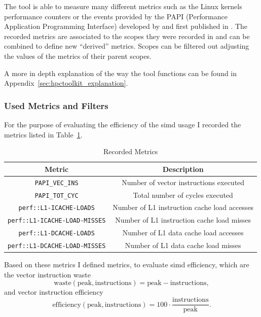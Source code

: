 \documentclass[a4paper, 11pt]{memoir}
\begin{document}
    The tool is able to measure many different metrics such as the Linux kernels performance counters or the events
    provided by the PAPI (Performance Application Programming Interface) developed by \citeauthor{papi} and first published
    in \cite{papi}. The recorded metrics are associated to the scopes they were recorded in and can be combined to define
    new \enquote{derived} metrics. Scopes can be filtered out adjusting the values of the metrics of their parent scopes.

    A more in depth explanation of the way the tool functions can be found in Appendix~\ref{sec:hpctoolkit_explanation}.

    \subsubsection{Used Metrics and Filters}
    For the purpose of evaluating the efficiency of the \gls{simd} usage I recorded the metrics listed in Table~\ref{tab:metrics}.
    \begin{table}[b]
        \centering
        \begin{tabular}{|c|c|}
            \hline
            Metric & Description \\\hline
            \texttt{PAPI_VEC_INS} & Number of vector instructions executed\\
            \texttt{PAPI_TOT_CYC} & Total number of cycles executed\\
            \texttt{perf::L1-ICACHE-LOADS} & Number of L1 instruction cache load accesses\\
            \texttt{perf::L1-ICACHE-LOAD-MISSES} & Number of L1 instruction cache load misses\\
            \texttt{perf::L1-DCACHE-LOADS} & Number of L1 data cache load accesses\\
            \texttt{perf::L1-DCACHE-LOAD-MISSES} & Number of L1 data cache load misses\\
            \hline
        \end{tabular}
        \caption{Recorded Metrics}
        \label{tab:metrics}
    \end{table}

    Based on these metrics I defined metrics, to evaluate \gls{simd} efficiency, which are the vector instruction waste
    \begin{equation}
        \text{waste}(\text{peak}, \text{instructions}) = \text{peak} - \text{instructions},
        \label{eq:vec_waste}
    \end{equation}
    and vector instruction efficiency
    \begin{equation}
        \text{efficiency}(\text{peak}, \text{instructions}) = 100 \cdot \frac{\text{instructions}}{\text{peak}}.
        \label{eq:vec_efficiency}
    \end{equation}
\end{document}
